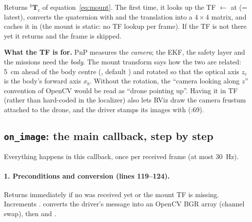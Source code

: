 Returns ${}^b\mathbf T_c$ of equation~\eqref{eq:mount}. The first time, it looks up the TF
$\leftarrow$ at  (= latest), converts the quaternion with
 and the translation into a $4\times4$ matrix, and caches it in 
(the mount is static: no TF lookup per frame). If the TF is not there yet it returns  and the frame is
skipped.

\begin{keypoint}
\textbf{What the  TF is for.} PnP measures the \emph{camera}; the EKF, the safety layer
and the missions need the \emph{body}. The mount transform says how the two are related: 5~cm ahead of the body
centre (, default \code{[0.05, 0.0, 0.0]}) and rotated so that the optical axis $z_c$ is the body's
forward axis $x_b$. Without the rotation, the ``camera looking along $z$'' convention of OpenCV would be read as
``drone pointing up''. Having it in TF (rather than hard-coded in the localizer) also lets RViz draw the camera
frustum attached to the drone, and the driver stamps its images with 
(:69).
\end{keypoint}

\subsection{\texttt{on\_image}: the main callback, step by step}

Everything happens in this callback, once per received frame (at most 30~Hz).

\paragraph{1. Preconditions and conversion (lines 119--124).} Returns immediately if no  was received
yet or the mount TF is missing. Increments .  converts the driver's
 message into an OpenCV BGR array (channel swap), then  and
.

